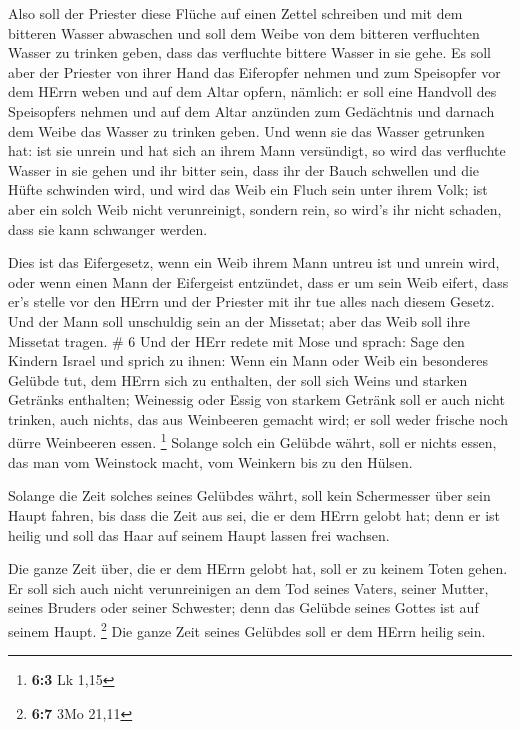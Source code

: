  Also soll der Priester diese Flüche auf einen Zettel
schreiben und mit dem bitteren Wasser abwaschen  und soll
dem Weibe von dem bitteren verfluchten Wasser zu trinken geben, dass das
verfluchte bittere Wasser in sie gehe.  Es soll aber der
Priester von ihrer Hand das Eiferopfer nehmen und zum Speisopfer vor dem
HErrn weben und auf dem Altar opfern, nämlich:  er soll
eine Handvoll des Speisopfers nehmen und auf dem Altar anzünden zum
Gedächtnis und darnach dem Weibe das Wasser zu trinken geben.
 Und wenn sie das Wasser getrunken hat: ist sie unrein und
hat sich an ihrem Mann versündigt, so wird das verfluchte Wasser in sie
gehen und ihr bitter sein, dass ihr der Bauch schwellen und die Hüfte
schwinden wird, und wird das Weib ein Fluch sein unter ihrem Volk;
 ist aber ein solch Weib nicht verunreinigt, sondern rein,
so wird's ihr nicht schaden, dass sie kann schwanger werden.

 Dies ist das Eifergesetz, wenn ein Weib ihrem Mann untreu
ist und unrein wird,  oder wenn einen Mann der Eifergeist
entzündet, dass er um sein Weib eifert, dass er's stelle vor den HErrn
und der Priester mit ihr tue alles nach diesem Gesetz.  Und
der Mann soll unschuldig sein an der Missetat; aber das Weib soll ihre
Missetat tragen. \# 6  Und der HErr redete mit Mose und
sprach:  Sage den Kindern Israel und sprich zu ihnen: Wenn
ein Mann oder Weib ein besonderes Gelübde tut, dem HErrn sich zu
enthalten,  der soll sich Weins und starken Getränks
enthalten; Weinessig oder Essig von starkem Getränk soll er auch nicht
trinken, auch nichts, das aus Weinbeeren gemacht wird; er soll weder
frische noch dürre Weinbeeren essen. \footnote{\textbf{6:3} Lk 1,15}
 Solange solch ein Gelübde währt, soll er nichts essen, das
man vom Weinstock macht, vom Weinkern bis zu den Hülsen.

 Solange die Zeit solches seines Gelübdes währt, soll kein
Schermesser über sein Haupt fahren, bis dass die Zeit aus sei, die er
dem HErrn gelobt hat; denn er ist heilig und soll das Haar auf seinem
Haupt lassen frei wachsen.

 Die ganze Zeit über, die er dem HErrn gelobt hat, soll er
zu keinem Toten gehen.  Er soll sich auch nicht
verunreinigen an dem Tod seines Vaters, seiner Mutter, seines Bruders
oder seiner Schwester; denn das Gelübde seines Gottes ist auf seinem
Haupt. \footnote{\textbf{6:7} 3Mo 21,11}  Die ganze Zeit
seines Gelübdes soll er dem HErrn heilig sein.

